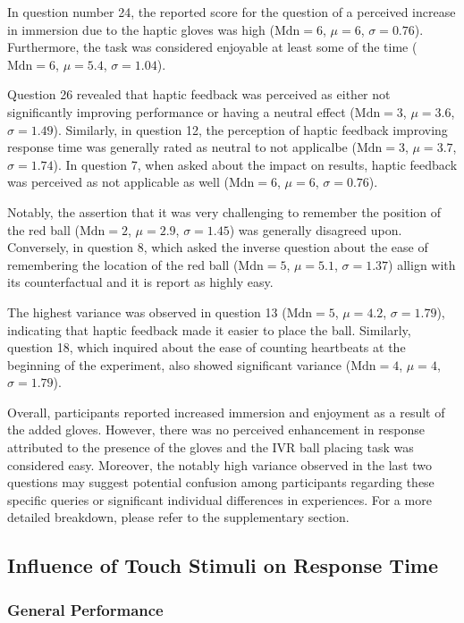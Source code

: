 \documentclass[12pt,oneside,openright]{report}
\begin{document}
In question number 24, the reported score for the question of a perceived increase in immersion due to the haptic gloves was high ($\text{Mdn} = 6$, $\mu = 6$, $\sigma = 0.76$). Furthermore, the task was considered enjoyable at least some of the time ($\text{Mdn} = 6$, $\mu = 5.4$, $\sigma = 1.04$).
        
Question 26 revealed that haptic feedback was perceived as either not significantly improving performance or having a neutral effect ($\text{Mdn} = 3$, $\mu = 3.6$, $\sigma = 1.49$). Similarly, in question 12, the perception of haptic feedback improving response time was generally rated as neutral to not applicalbe ($\text{Mdn} = 3$, $\mu = 3.7$, $\sigma = 1.74$). In question 7, when asked about the impact on results, haptic feedback was perceived as not applicable as well ($\text{Mdn} = 6$, $\mu = 6$, $\sigma = 0.76$).
    
Notably, the assertion that it was very challenging to remember the position of the red ball ($\text{Mdn} = 2$, $\mu = 2.9$, $\sigma = 1.45$) was generally disagreed upon. Conversely, in question 8, which asked the inverse question about the ease of remembering the location of the red ball ($\text{Mdn} = 5$, $\mu = 5.1$, $\sigma = 1.37$) allign with its counterfactual and it is report as highly easy. 
    
The highest variance was observed in question 13 ($\text{Mdn} = 5$, $\mu = 4.2$, $\sigma = 1.79$), indicating that haptic feedback made it easier to place the ball. Similarly, question 18, which inquired about the ease of counting heartbeats at the beginning of the experiment, also showed significant variance ($\text{Mdn} = 4$, $\mu = 4$, $\sigma = 1.79$). 
    
Overall, participants reported increased immersion and enjoyment as a result of the added gloves. However, there was no perceived enhancement in response attributed to the presence of the gloves and the IVR ball placing task was considered easy. Moreover, the notably high variance observed in the last two questions may suggest potential confusion among participants regarding these specific queries or significant individual differences in experiences. For a more detailed breakdown, please refer to the supplementary section.
    
\subsection*{Influence of Touch Stimuli on Response Time}
\subsubsection*{General Performance}
\end{document}
